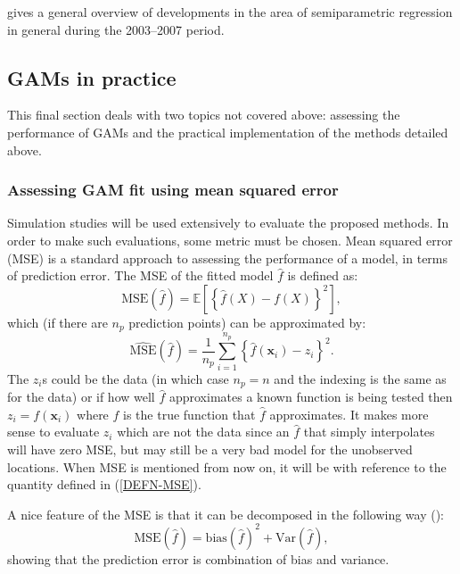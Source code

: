 \cite{ruppertreview} gives a general overview of developments in the area of semiparametric regression in general during the 2003--2007 period.




\subsection{GAMs in practice}

This final section deals with two topics not covered above: assessing the performance of GAMs and the practical implementation of the methods detailed above.

\subsubsection{Assessing GAM fit using mean squared error}

Simulation studies will be used extensively to evaluate the proposed methods. In order to make such evaluations, some metric must be chosen. Mean squared error (MSE) is a standard approach to assessing the performance of a model, in terms of prediction error. The MSE of the fitted model $\hat{f}$ is defined as:
\begin{equation*}
\text{MSE}(\hat{f}) = \mathbb{E}\left [\left \{ \hat{f}(X) - f(X) \right \}^2 \right ],
\end{equation*}
which (if there are $n_p$ prediction points) can be approximated by:
\begin{equation}
\hat{\text{MSE}}(\hat{f}) = \frac{1}{n_p} \sum_{i=1}^{n_p} \left \{\hat{f}(\mathbf{x}_i) - z_i \right \}^2.
\label{DEFN-MSE}
\end{equation}
The $z_i$s could be the data (in which case $n_p=n$ and the indexing is the same as for the data) or if how well $\hat{f}$ approximates a known function is being tested then $z_i=f(\mathbf{x}_i)$ where $f$ is the true function that $\hat{f}$ approximates. It makes more sense to evaluate $z_i$ which are not the data since an $\hat{f}$ that simply interpolates will have zero MSE, but may still be a very bad model for the unobserved locations. When MSE is mentioned from now on, it will be with reference to the quantity defined in (\ref{DEFN-MSE}).

A nice feature of the MSE is that it can be decomposed in the following way (\cite[p. 24]{elements}):
\begin{equation*}
\text{MSE}(\hat{f}) = \text{bias} \left ( \hat{f}\right )^2 + \text{Var}\left (\hat{f} \right ),
\end{equation*}
showing that the prediction error is combination of bias and variance.


